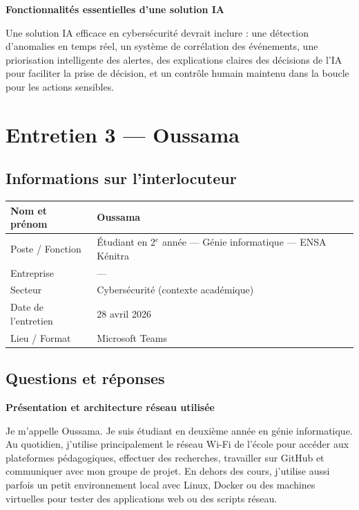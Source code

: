 \documentclass[12pt,a4paper]{report}
\begin{document}
\bigskip
\textbf{Fonctionnalités essentielles d'une solution IA}

Une solution IA efficace en cybers\'{e}curit\'{e} devrait inclure : une d\'{e}tection d'anomalies en temps r\'{e}el, un syst\`{e}me de corr\'{e}lation des \'{e}v\'{e}nements, une priorisation intelligente des alertes, des explications claires des d\'{e}cisions de l'IA pour faciliter la prise de d\'{e}cision, et un contr\^{o}le humain maintenu dans la boucle pour les actions sensibles.

\clearpage

\section{Entretien 3 --- Oussama}

\subsection*{Informations sur l'interlocuteur}

\begin{tabular}{@{}L{4cm} L{10.5cm}@{}}
  \hline
  Nom et pr\'{e}nom      & Oussama \\
  \hline
  Poste / Fonction   & \'{E}tudiant en 2$^{e}$ ann\'{e}e --- G\'{e}nie informatique --- ENSA K\'{e}nitra \\
  \hline
  Entreprise         & --- \\
  \hline
  Secteur            & Cybers\'{e}curit\'{e} (contexte acad\'{e}mique) \\
  \hline
  Date de l'entretien & 28 avril 2026 \\
  \hline
  Lieu / Format      & Microsoft Teams \\
  \hline
\end{tabular}

\subsection*{Questions et réponses}

\textbf{Présentation et architecture réseau utilisée}

Je m'appelle Oussama. Je suis \'{e}tudiant en deuxi\`{e}me ann\'{e}e en g\'{e}nie informatique. Au quotidien, j'utilise principalement le r\'{e}seau Wi-Fi de l'\'{e}cole pour acc\'{e}der aux plateformes p\'{e}dagogiques, effectuer des recherches, travailler sur GitHub et communiquer avec mon groupe de projet. En dehors des cours, j'utilise aussi parfois un petit environnement local avec Linux, Docker ou des machines virtuelles pour tester des applications web ou des scripts r\'{e}seau.
\end{document}
